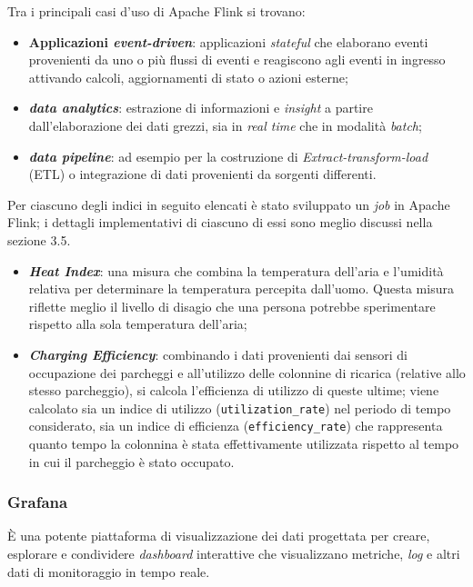 Tra i principali casi d'uso di Apache Flink si trovano:
\begin{itemize}
	\item \textbf{Applicazioni \textit{event-driven}}: applicazioni \textit{stateful} che elaborano eventi provenienti da uno o più flussi di eventi e reagiscono agli eventi in ingresso attivando calcoli, aggiornamenti di stato o azioni esterne;
	\item \textbf{\textit{data analytics}}: estrazione di informazioni e \textit{insight} a partire dall'elaborazione dei dati grezzi, sia in \textit{real time} che in modalità \textit{batch};
	\item \textbf{\textit{data pipeline}}: ad esempio per la costruzione di \textit{Extract-transform-load} (ETL) o integrazione di dati provenienti da sorgenti differenti.
\end{itemize}

Per ciascuno degli indici in seguito elencati è stato sviluppato un \textit{job} in Apache Flink; i dettagli implementativi di ciascuno di essi sono meglio discussi nella sezione 3.5. %
\begin{itemize}
	\item \textbf{\textit{Heat Index}}: una misura che combina la temperatura dell'aria e l'umidità relativa per determinare la temperatura percepita dall'uomo. Questa misura riflette meglio il livello di disagio che una persona potrebbe sperimentare rispetto alla sola temperatura dell'aria;
	\item \textbf{\textit{Charging Efficiency}}: combinando i dati provenienti dai sensori di occupazione dei parcheggi e all'utilizzo delle colonnine di ricarica (relative
	      allo stesso parcheggio), si calcola l'efficienza di utilizzo di queste ultime; viene calcolato sia un indice di utilizzo (\texttt{utilization\_rate}) nel periodo
	      di tempo considerato, sia un indice di efficienza (\texttt{efficiency\_rate}) che rappresenta quanto tempo la colonnina è stata effettivamente utilizzata rispetto
	      al tempo in cui il parcheggio è stato occupato.
\end{itemize}

\subsubsection{Grafana}
È una potente piattaforma di visualizzazione dei dati progettata per creare, esplorare e condividere \textit{dashboard}  interattive che visualizzano metriche, \textit{log} e altri dati di monitoraggio in tempo reale.

